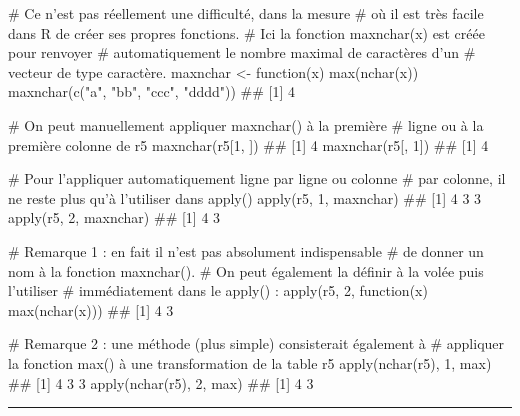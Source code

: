 \documentclass[12pt,twosided, notitlepage]{book}
\newenvironment{Shaded}{}{}
\newcommand{\KeywordTok}[1]{\textcolor[rgb]{0.00,0.00,1.00}{{#1}}}
\newcommand{\DecValTok}[1]{{#1}}
\newcommand{\StringTok}[1]{\textcolor[rgb]{0.00,0.50,0.50}{{#1}}}
\newcommand{\CommentTok}[1]{\textcolor[rgb]{0.00,0.50,0.00}{{#1}}}
\newcommand{\NormalTok}[1]{{#1}}
\renewenvironment{Shaded}{\begin{snugshade}}{\end{snugshade}}
\begin{document}
\begin{enumerate}
\begin{Shaded}
\begin{Highlighting}[]
\CommentTok{# Ce n'est pas réellement une difficulté, dans la mesure}
\CommentTok{# où il est très facile dans R de créer ses propres fonctions.}
\CommentTok{# Ici la fonction maxnchar(x) est créée pour renvoyer}
\CommentTok{# automatiquement le nombre maximal de caractères d'un}
\CommentTok{# vecteur de type caractère.}
\NormalTok{maxnchar <-}\StringTok{ }\NormalTok{function(x) }\KeywordTok{max}\NormalTok{(}\KeywordTok{nchar}\NormalTok{(x))}
\KeywordTok{maxnchar}\NormalTok{(}\KeywordTok{c}\NormalTok{(}\StringTok{"a"}\NormalTok{, }\StringTok{"bb"}\NormalTok{, }\StringTok{"ccc"}\NormalTok{, }\StringTok{"dddd"}\NormalTok{))}
  \NormalTok{## [1] 4}

\CommentTok{# On peut manuellement appliquer maxnchar() à la première}
\CommentTok{# ligne ou à la première colonne de r5}
\KeywordTok{maxnchar}\NormalTok{(r5[}\DecValTok{1}\NormalTok{, ])}
  \NormalTok{## [1] 4}
\KeywordTok{maxnchar}\NormalTok{(r5[, }\DecValTok{1}\NormalTok{])}
  \NormalTok{## [1] 4}

\CommentTok{# Pour l'appliquer automatiquement ligne par ligne ou colonne}
\CommentTok{# par colonne, il ne reste plus qu'à l'utiliser dans apply()}
\KeywordTok{apply}\NormalTok{(r5, }\DecValTok{1}\NormalTok{, maxnchar)}
  \NormalTok{## [1] 4 3 3}
\KeywordTok{apply}\NormalTok{(r5, }\DecValTok{2}\NormalTok{, maxnchar)}
  \NormalTok{## [1] 4 3}

\CommentTok{# Remarque 1 : en fait il n'est pas absolument indispensable}
\CommentTok{# de donner un nom à la fonction maxnchar(). }
\CommentTok{# On peut également la définir à la volée puis l'utiliser }
\CommentTok{# immédiatement dans le apply() : }
\KeywordTok{apply}\NormalTok{(r5, }\DecValTok{2}\NormalTok{, function(x) }\KeywordTok{max}\NormalTok{(}\KeywordTok{nchar}\NormalTok{(x)))}
  \NormalTok{## [1] 4 3}

\CommentTok{# Remarque 2 : une méthode (plus simple) consisterait également à }
\CommentTok{# appliquer la fonction max() à une transformation de la table r5}
\KeywordTok{apply}\NormalTok{(}\KeywordTok{nchar}\NormalTok{(r5), }\DecValTok{1}\NormalTok{, max)}
  \NormalTok{## [1] 4 3 3}
\KeywordTok{apply}\NormalTok{(}\KeywordTok{nchar}\NormalTok{(r5), }\DecValTok{2}\NormalTok{, max)}
  \NormalTok{## [1] 4 3}
\end{Highlighting}
\end{Shaded}

  \begin{center} \rule{0.5\linewidth}{\linethickness}\end{center}

  \bigskip  \fi 
\end{enumerate}
\end{document}
